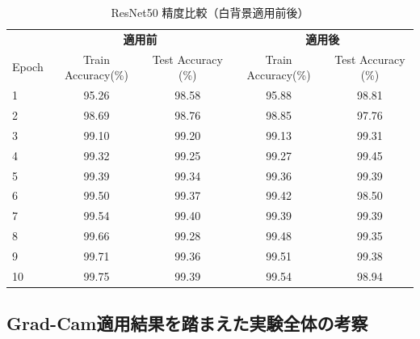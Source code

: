 \documentclass[a4paper,11pt,titlepage]{jsarticle}
\begin{document}
\begin{table}[H]
\centering
\caption{ResNet50 精度比較（白背景適用前後）}
\label{tab:comparison_resnet50}
\begin{tabular}{l|cc|cc}
\hline
      & \multicolumn{2}{c|}{\textbf{適用前 }} & \multicolumn{2}{c}{\textbf{適用後 }} \\ \cline{2-5} 
Epoch & Train Accuracy(\%) & Test Accuracy (\%) & Train Accuracy(\%) & Test Accuracy (\%) \\
\hline
1     & 95.26           & 98.58                & 95.88           & 98.81                \\
2     & 98.69           & 98.76                & 98.85           & 97.76                \\
3     & 99.10           & 99.20                & 99.13           & 99.31                \\
4     & 99.32           & 99.25                & 99.27           & 99.45                \\
5     & 99.39           & 99.34                & 99.36           & 99.39                \\
6     & 99.50           & 99.37                & 99.42           & 98.50                \\
7     & 99.54           & 99.40                & 99.39           & 99.39                \\
8     & 99.66           & 99.28                & 99.48           & 99.35                \\
9     & 99.71           & 99.36                & 99.51           & 99.38                \\
10    & 99.75           & 99.39                & 99.54           & 98.94                \\
\hline
\end{tabular}
\end{table}





\subsection{Grad-Cam適用結果を踏まえた実験全体の考察}
\end{document}

